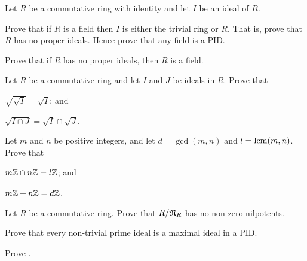 \begin{problem}\label{problem-ring-is-field-iff-no-proper-ideals}
    Let $R$ be a commutative ring with identity and let $I$ be an ideal of $R$.
    \begin{partquestions}{\alph*}
        \item Prove that if $R$ is a field then $I$ is either the trivial ring or $R$. That is, prove that $R$ has no proper ideals. Hence prove that any field is a PID.
        \item Prove that if $R$ has no proper ideals, then $R$ is a field.
    \end{partquestions}
\end{problem}

\begin{problem}
    Let $R$ be a commutative ring and let $I$ and $J$ be ideals in $R$. Prove that
    \begin{partquestions}{\alph*}
        \item $\sqrt{\sqrt{I}} = \sqrt{I}$; and
        \item $\sqrt{I \cap J} = \sqrt{I} \cap \sqrt{J}$.
    \end{partquestions}
\end{problem}

\begin{problem}
    Let $m$ and $n$ be positive integers, and let $d = \gcd(m,n)$ and $l = \mathrm{lcm}(m,n)$. Prove that
    \begin{partquestions}{\alph*}
        \item $m\mathbb{Z} \cap n\mathbb{Z} = l\mathbb{Z}$; and
        \item $m\mathbb{Z} + n\mathbb{Z} = d\mathbb{Z}$.
    \end{partquestions}
\end{problem}

\begin{problem}
    Let $R$ be a commutative ring. Prove that $R / \mathfrak{N}_{R}$ has no non-zero nilpotents.
\end{problem}

\begin{problem}\label{problem-non-trivial-prime-ideal-is-maximal-in-PID}
    Prove that every non-trivial prime ideal is a maximal ideal in a PID.
\end{problem}

\begin{problem}\label{problem-principal-ideals-equal-iff-associates}
    Prove .
\end{problem}
